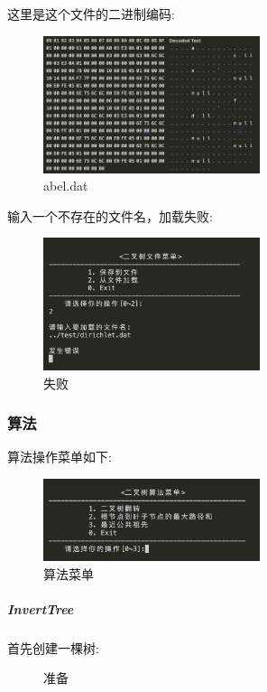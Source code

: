 \documentclass[supercite]{Experimental_Report}
\theoremstyle{definition}
\begin{document}
\noindent
这里是这个文件的二进制编码:
\begin{figure}[H]
	\centering
	\includegraphics[width=2.5in]{binary_tree/file/abel_dat.png}
	\caption{abel.dat}
	\label{fig5-67}
\end{figure}

\noindent
输入一个不存在的文件名，加载失败:
\begin{figure}[H]
	\centering
	\includegraphics[width=2.5in]{binary_tree/file/error.png}
	\caption{失败}
	\label{fig5-68}
\end{figure}

\clearpage
\subsubsection{算法}
\noindent
算法操作菜单如下:
\begin{figure}[htbp]
	\centering
	\includegraphics[width=2.5in]{binary_tree/algo/menu.png}
	\caption{算法菜单}
	\label{fig5-69}
\end{figure}

\subparagraph{InvertTree}
\noindent
首先创建一棵树:
\begin{figure}[htbp]
	\centering
	\centering
	\caption{准备}
	\label{fig5-70}
\end{figure}
\end{document}
